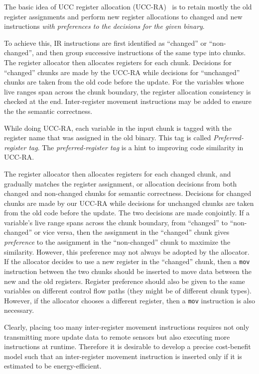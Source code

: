 The basic idea of UCC register allocation (UCC-RA)~\cite{ucc} is to retain mostly the old register assignments and perform new register allocations to changed and new instructions {\em with preferences to the decisions for the given binary}. 

To achieve this, IR instructions are first identified as ``changed'' or ``non-changed'', and then group successive instructions of the same type into chunks. The register allocator then allocates registers for each chunk.
Decisions for ``changed'' chunks are made by the UCC-RA while decisions for ``unchanged'' chunks are taken from the old code before the update. For the variables whose live ranges span across the chunk boundary, the register allocation consistency is checked at the end. Inter-register movement instructions may be added to ensure the the semantic correctness.

While doing UCC-RA, each variable in the input chunk is tagged with the register name that was assigned in the old binary. This tag is called {\em Preferred-register tag}. The {\em preferred-register tag} is a hint to improving code similarity in UCC-RA.

The register allocator then allocates registers for each changed chunk, and gradually matches the register assignment, or allocation decisions from both changed and non-changed chunks for semantic correctness. Decisions for changed chunks are made by our UCC-RA while decisions for unchanged chunks are taken from the old code before the update. The two decisions are made conjointly. If a variable's live range spans across the chunk boundary, from ``changed'' to ``non-changed'' or vice versa, then the assignment in the ``changed'' chunk gives {\em preference} to the assignment in the ``non-changed'' chunk to maximize the similarity. However, this preference may not always be adopted by the allocator. If the allocator decides to use a new register in the ``changed'' chunk, then a {\tt mov} instruction between the two chunks should be inserted to move data between the new and the old registers. Register preference should also be given to the same variables on different control flow paths (they might be of different chunk types). However, if the allocator chooses a different register, then a {\tt mov} instruction is also necessary.

Clearly, placing too many inter-register movement instructions requires not only transmitting more update data to remote sensors but also executing more instructions at runtime. Therefore it is desirable to develop a precise cost-benefit model such that an inter-register movement instruction is inserted only if it is estimated to be energy-efficient.

